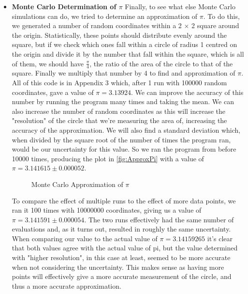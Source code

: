 \documentclass[12pt]{article}
\begin{document}
\begin{itemize}
        \item \textbf{Monte Carlo Determination of $\pi$}\newline
        Finally, to see what else Monte Carlo simulations can do, we tried to determine an approximation 
        of $\pi$. To do this, we generated a number of random coordinates within a 2 $\times$ 2 square 
        around the origin. Statistically, these points should distribute evenly around the square, 
        but if we check which ones fall within a circle of radius 1 centred on the origin and divide 
        it by the number that fall within the square, which is all of them, we should have 
        $\frac{\pi}{4}$, the ratio of the area of the circle to that of the square. Finally we 
        multiply that number by 4 to find and approximation of $\pi$. All of this code is in 
        Appendix 3 which, after 1 run with 100000 random coordinates, gave a value of $\pi = 3.13924$. 
        \newline
        \newline
        We can improve the accuracy of this number by running the program many times and taking the 
        mean. We can also increase the number of random coordinates as this will increase the "resolution" 
        of the circle that we're measuring the area of, increasing the accuracy of the approximation.
        We will also find a standard deviation which, when divided by the square root of the number of 
        times the program ran, would be our uncertainty for this value. So we ran 
        the program from before 10000 times, producing the plot in \autoref{fig:ApproxPi} with 
        a value of $\pi = 3.141615 \pm 0.000052$. %
        
        \begin{figure}[H]
            \begin{center}
               \scalebox{.7}{}
               \caption{Monte Carlo Approximation of $\pi$}
               \label{fig:ApproxPi}
            \end{center}
        \end{figure}
        
        \noindent
        To compare the effect of multiple runs to the effect of more data points, we ran it 100 times with 
        10000000 coordinates, giving us a value of $\pi = 3.141591 \pm 0.000054$. The two runs effectively 
        had the same number of evaluations and, as it turns out, resulted in roughly the same uncertainty.
        When comparing our value to the actual value of $\pi = 3.14159265$ it's clear that both values 
        agree with the actual value of pi, but the value determined with "higher resolution", in this 
        case at least, seemed to be more accurate when not considering the uncertainty. This makes sense 
        as having more points will effectively give a more accurate measurement of the circle, and thus 
        a more accurate approximation. %
        
    \end{itemize}
    \newpage
\end{document}
